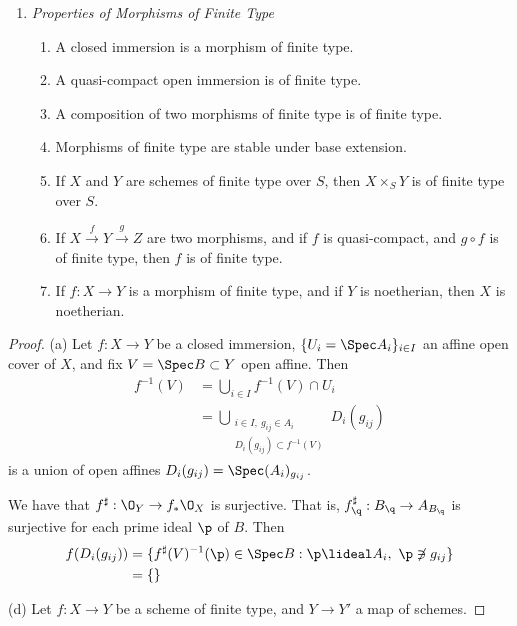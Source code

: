 \documentclass[12pt]{amsart}
\begin{document}
\begin{enumerate}
 	\item[3.13.] {
       \emph{Properties of Morphisms of Finite Type}
       \begin{enumerate}
         \item A closed immersion is a morphism of finite type.
         \item A quasi-compact open immersion is of finite type.
         \item A composition of two morphisms of finite type is of finite type.
         \item Morphisms of finite type are stable under base extension.
         \item If $X$ and $Y$ are schemes of finite type over $S$, then $X\times_S Y$ is of finite type over $S$.
         \item If $X\xrightarrow{f}Y\xrightarrow{g}Z$ are two morphisms, and if $f$ is quasi-compact, and $g\circ f$ is of finite type, then $f$ is of finite type.
         \item If $f:X\to Y$ is a morphism of finite type, and if $Y$ is noetherian, then $X$ is noetherian.
       \end{enumerate}
     }
\end{enumerate}

\begin{proof}
  (a) Let $f:X\to Y$ be a closed immersion, $\{U_i=\Spec A_i\}_{i\in I}$ an affine open cover of $X$, and fix $V=\Spec B\subset Y$ open affine.
  Then
  \begin{align*}
    f^{-1}(V)&= \bigcup_{i\in I} f^{-1}(V)\cap U_i \\
             &= \bigcup_{\substack{i\in I,~g_{ij}\in A_i \\ D_i(g_{ij}) \subset f^{-1}(V)}} D_i(g_{ij})
  \end{align*}
  is a union of open affines $D_i(g_{ij})=\Spec (A_i)_{g_{ij}}$.

  We have that $f^\sharp:\O_Y\to f_*\O_X$ is surjective.
  That is, $f^\sharp_\q:B_\q\to A_{B_\q}$ is surjective for each prime ideal $\p$ of $B$.
  Then
  \begin{align*}
    f(D_{i}(g_{ij})) &= \{f^\sharp(V)^{-1}(\p)\in \Spec B:\p\lideal A_i, ~\p\not\ni g_{ij}\} \\
                       &= \{\}
  \end{align*}

  (d) Let $f:X\to Y$ be a scheme of finite type, and $Y\to Y'$ a map of schemes.
\end{proof}
\end{document}
